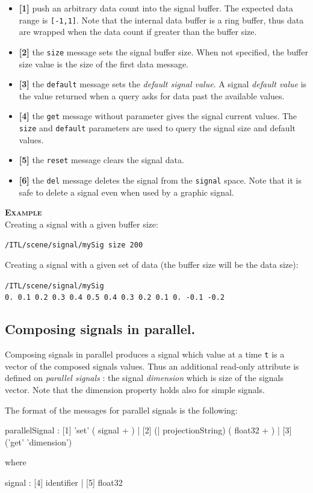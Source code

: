 \documentclass[a4paper,twoside]{report}
\newcommand{\subsublevel}[1]	{\subsection{#1}}
\newcommand{\OSC}[1]		{\texttt{#1}}
\newcommand{\values}[1]	{\texttt{#1}}
\newcommand{\example}		{\textbf{\hspace{-1.5cm}\textbf{\textsc{Example }}}}
\newcommand{\sample}	[1]			{\vspace{-2mm}\begin{center}\colorbox{mygrey}{
								\begin{minipage}[t]{0.9\columnwidth} 
								{\small \texttt{#1}}
								\end{minipage}}\end{center}}
\begin{document}
\begin{itemize}
\item \textbf{[1]} push an arbitrary data count into the signal buffer. The expected data range is \values{[-1,1]}. Note that the internal data buffer is a ring buffer, thus data are wrapped when the data count if greater than the buffer size. 
\item \textbf{[2]} the \OSC{size} message sets the signal buffer size. When not specified, the buffer size value is the size of the first data message. 
\item \textbf{[3]} the \OSC{default} message sets the \emph{default signal value}. A signal \emph{default value} is the value returned when a query asks for data past the available values.
\item \textbf{[4]} the \OSC{get} message without parameter gives the signal current values. The \OSC{size} and  \OSC{default} parameters are used to query the signal size and default values.
\item \textbf{[5]} the \OSC{reset} message clears the signal data. 
\item \textbf{[6]} the \OSC{del} message deletes the signal from the \OSC{signal} space. Note that it is safe to delete a signal even when used by a graphic signal. 
\end{itemize}

\example \\
Creating a signal with a given buffer size:
\sample{/ITL/scene/signal/mySig size 200}
Creating a signal with a given set of data (the buffer size will be the data size):
\sample{/ITL/scene/signal/mySig 0.\ 0.1\ 0.2\ 0.3\ 0.4\ 0.5\ 0.4\ 0.3\ 0.2\ 0.1\ 0.\ -0.1\ -0.2}


\subsublevel{Composing signals in parallel.}\label{parcomp}
Composing signals in parallel produces a signal which value at a time \values{t} is a vector of the composed signals values. Thus an additional read-only attribute is defined on \emph{parallel signals} : the signal \emph{dimension} which is size of the signals vector. Note that the dimension property holds also for simple signals.

The format of the messages for parallel signals is the following:
\begin{rail}
parallelSignal :  
		  [1] 'set' ( signal + )
		| [2] (| projectionString) ( float32 + )
		| [3] ('get' 'dimension') 
\end{rail}
where 
\begin{rail}
signal :  
		  [4] identifier
		| [5] float32
\end{rail}
\end{document}
